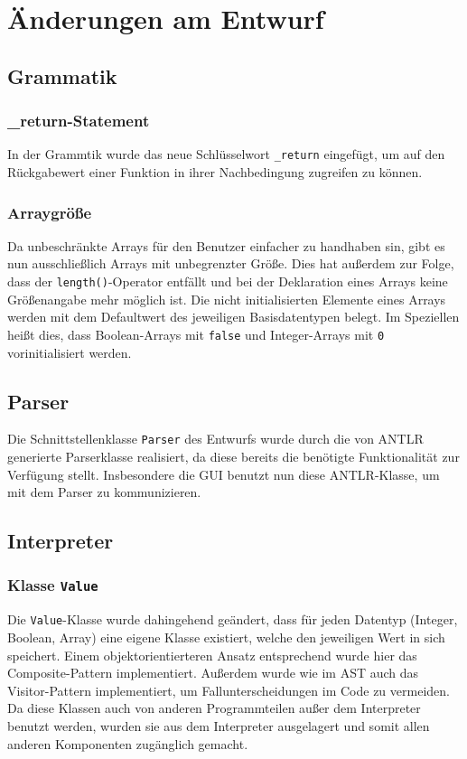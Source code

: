 \section{Änderungen am Entwurf}
\subsection{Grammatik}
\subsubsection{\_return-Statement}
In der Grammtik wurde das neue Schlüsselwort \texttt{\_return} eingefügt, um auf den Rückgabewert einer Funktion in ihrer Nachbedingung zugreifen zu können.
\subsubsection{Arraygröße}
Da unbeschränkte Arrays für den Benutzer einfacher zu handhaben sin, gibt es nun ausschließlich Arrays mit unbegrenzter Größe. Dies hat außerdem zur Folge, dass der \texttt{length()}-Operator entfällt und bei der Deklaration eines Arrays keine Größenangabe mehr möglich ist. Die nicht initialisierten Elemente eines Arrays werden mit dem Defaultwert des jeweiligen Basisdatentypen belegt. Im Speziellen heißt dies, dass Boolean-Arrays mit \texttt{false} und Integer-Arrays mit \texttt{0} vorinitialisiert werden.

\subsection{Parser}
Die Schnittstellenklasse \texttt{Parser} des Entwurfs wurde durch die von ANTLR generierte Parserklasse realisiert, da diese bereits die benötigte Funktionalität zur Verfügung stellt. Insbesondere die GUI benutzt nun diese ANTLR-Klasse, um mit dem Parser zu kommunizieren.

\subsection{Interpreter}
\subsubsection{Klasse \texttt{Value}}
Die \texttt{Value}-Klasse wurde dahingehend geändert, dass für jeden Datentyp (Integer, Boolean, Array) eine eigene Klasse existiert, welche den jeweiligen Wert in sich speichert. Einem objektorientierteren Ansatz entsprechend wurde hier das Composite-Pattern implementiert. Außerdem wurde wie im AST auch das Visitor-Pattern implementiert, um Fallunterscheidungen im Code zu vermeiden. Da diese Klassen auch von anderen Programmteilen außer dem Interpreter benutzt werden, wurden sie aus dem Interpreter ausgelagert und somit allen anderen Komponenten zugänglich gemacht.

